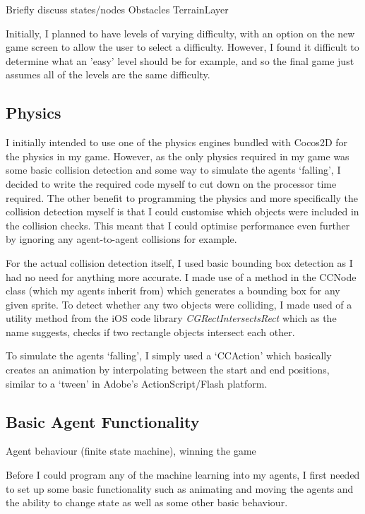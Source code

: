 \documentclass[a4paper,oneside]{report}
\begin{document}
Briefly discuss states/nodes
Obstacles
TerrainLayer

Initially, I planned to have levels of varying difficulty, with an option on the new game screen to allow the user to select a difficulty. However, I found it difficult to determine what an 'easy' level should be for example, and so the final game just assumes all of the levels are the same difficulty.

\subsection{Physics}

I initially intended to use one of the physics engines bundled with Cocos2D for the physics in my game. However, as the only physics required in my game was some basic collision detection and some way to simulate the agents `falling', I decided to write the required code myself to cut down on the processor time required. The other benefit to programming the physics and more specifically the collision detection myself is that I could customise which objects were included in the collision checks. This meant that I could optimise performance even further by ignoring any agent-to-agent collisions for example.

For the actual collision detection itself, I used basic bounding box detection as I had no need for anything more accurate. I made use of a method in the CCNode class (which my agents inherit from) which generates a bounding box for any given sprite. To detect whether any two objects were colliding, I made used of a utility method from the iOS code library \emph{CGRectIntersectsRect} which as the name suggests, checks if two rectangle objects intersect each other.

To simulate the agents `falling', I simply used a `CCAction' which basically creates an animation by interpolating between the start and end positions, similar to a `tween' in Adobe's ActionScript/Flash platform.  

\subsection{Basic Agent Functionality} Agent behaviour (finite state machine), winning the game

Before I could program any of the machine learning into my agents, I first needed to set up some basic functionality such as animating and moving the agents and the ability to change state as well as some other basic behaviour.
\end{document}
